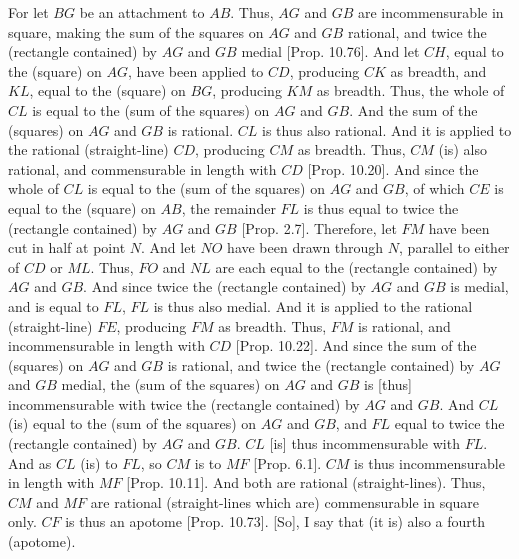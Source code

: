 \begin{Parallel}{}{}
{For let $BG$ be an attachment to $AB$. Thus, $AG$ and $GB$ are incommensurable in square, making the sum of the squares on $AG$ and $GB$ rational, and twice the (rectangle contained) by $AG$ and $GB$ medial [Prop. 10.76]. And let $CH$,
equal to the (square) on $AG$, have been applied to $CD$, producing
$CK$ as breadth, and $KL$, equal to the (square) on $BG$, producing
$KM$ as breadth. Thus, the whole of $CL$ is equal to the (sum of the
squares) on $AG$ and $GB$. And the sum of the (squares) on $AG$ and
$GB$ is rational. $CL$ is thus also rational. And it is applied to the
rational (straight-line) $CD$, producing $CM$ as breadth. Thus, $CM$
(is) also rational, and commensurable in length with $CD$ [Prop. 10.20]. And since the whole of $CL$
is equal to the (sum of the squares) on $AG$ and $GB$, of which
$CE$ is equal to the (square) on $AB$, the remainder $FL$ is thus
equal to twice the (rectangle contained) by $AG$ and $GB$ [Prop. 2.7]. Therefore, let $FM$ have been cut in
half at point $N$. And let $NO$ have been drawn through $N$, parallel
to either of $CD$ or $ML$. Thus, $FO$ and $NL$ are each
equal to the (rectangle contained) by $AG$ and $GB$. And since
twice the (rectangle contained) by $AG$ and $GB$ is medial, and is equal
to $FL$, $FL$ is thus also medial. And it is applied to the rational (straight-line) $FE$, producing $FM$ as breadth. Thus, $FM$ is  rational, and incommensurable in length with $CD$ [Prop. 10.22]. And since the sum of the (squares)
on $AG$ and $GB$ is rational, and twice the (rectangle contained) by $AG$
and $GB$ medial, the (sum of the squares) on $AG$ and $GB$
is [thus] incommensurable with twice the (rectangle contained)
by $AG$ and $GB$. And $CL$ (is) equal to the (sum of the squares)
on $AG$ and $GB$, and $FL$ equal to twice the (rectangle contained) by $AG$ and $GB$. $CL$ [is] thus incommensurable with $FL$. And as
$CL$ (is) to $FL$, so $CM$ is to $MF$ [Prop. 6.1]. 
$CM$ is thus incommensurable in length with $MF$ [Prop. 10.11]. And both are rational (straight-lines). 
Thus, $CM$ and $MF$ are rational (straight-lines which are) commensurable
in square only. $CF$ is thus an apotome [Prop. 10.73]. [So], I say that (it is) also
a fourth (apotome).

}
\end{Parallel}
